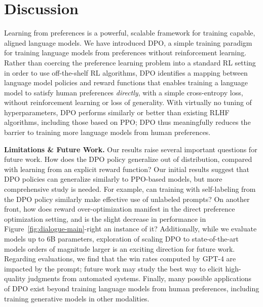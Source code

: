 \section{Discussion}
Learning from preferences is a powerful, scalable framework for training capable, aligned language models. We have introduced DPO, a simple training paradigm for training language models from preferences without reinforcement learning. Rather than coercing the preference learning problem into a standard RL setting in order to use off-the-shelf RL algorithms, DPO identifies a mapping between language model policies and reward functions that enables training a language model to satisfy human preferences \textit{directly}, with a simple cross-entropy loss, without reinforcement learning or loss of generality. With virtually no tuning of hyperparameters, DPO performs similarly or better than existing RLHF algorithms, including those based on PPO; DPO thus meaningfully reduces the barrier to training more language models from human preferences.

\textbf{Limitations \& Future Work.} Our results raise several important questions for future work. How does the DPO policy generalize out of distribution, compared with learning from an explicit reward function? Our initial results suggest that DPO policies can generalize similarly to PPO-based models, but more comprehensive study is needed. For example, can training with self-labeling from the DPO policy similarly make effective use of unlabeled prompts? On another front, how does reward over-optimization manifest in the direct preference optimization setting, and is the slight decrease in performance in Figure~\ref{fig:dialogue-main}-right an instance of it? Additionally, while we evaluate models up to 6B parameters, exploration of scaling DPO to state-of-the-art models orders of magnitude larger is an exciting direction for future work. Regarding evaluations, we find that the win rates computed by GPT-4 are impacted by the prompt; future work may study the best way to elicit high-quality judgments from automated systems. Finally, many possible applications of DPO exist beyond training language models from human preferences, including training generative models in other modalities.

